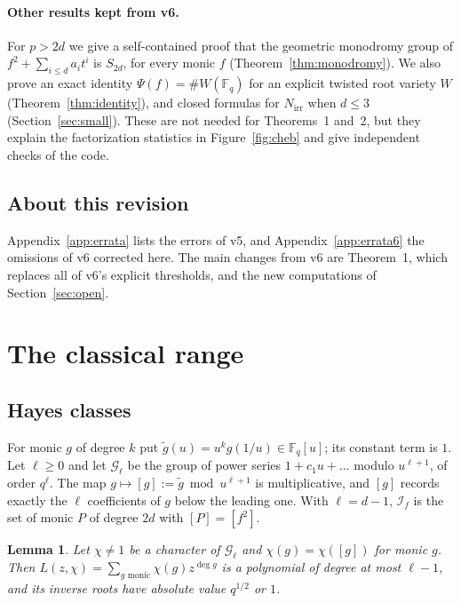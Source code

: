 \documentclass[11pt,a4paper]{article}
\newtheorem{lemma}[theorem]{Lemma}
\theoremstyle{definition}
\theoremstyle{remark}
\newcommand{\Fq}{\mathbb{F}_q}
\newcommand{\Nirr}{N_{\mathrm{irr}}}
\newcommand{\cI}{\mathcal{I}}
\begin{document}
\paragraph{Other results kept from v6.}
For $p>2d$ we give a self-contained proof that the geometric monodromy group of
$f^2+\sum_{i\le d}a_it^i$ is $S_{2d}$, for every monic $f$ (Theorem~\ref{thm:monodromy}).
We also prove an exact identity $\Psi(f)=\#W(\Fq)$ for an explicit twisted root variety $W$
(Theorem~\ref{thm:identity}), and closed formulas for $\Nirr$ when $d\le3$
(Section~\ref{sec:small}). These are not needed for Theorems~1 and~2, but they explain the
factorization statistics in Figure~\ref{fig:cheb} and give independent checks of the code.

\subsection{About this revision}
Appendix~\ref{app:errata} lists the errors of v5, and Appendix~\ref{app:errata6} the
omissions of v6 corrected here. The main changes from v6 are Theorem~1, which replaces all
of v6's explicit thresholds, and the new computations of Section~\ref{sec:open}.

\section{The classical range}\label{sec:classical}

\subsection{Hayes classes}
For monic $g$ of degree $k$ put $\tilde g(u)=u^kg(1/u)\in\Fq[u]$; its constant term is $1$.
Let $\ell\ge0$ and let $\mathcal G_\ell$ be the group of power series $1+c_1u+\dots$ modulo
$u^{\ell+1}$, of order $q^\ell$. The map $g\mapsto[g]:=\tilde g\bmod u^{\ell+1}$ is
multiplicative, and $[g]$ records exactly the $\ell$ coefficients of $g$ below the leading one.
With $\ell=d-1$, $\cI_f$ is the set of monic $P$ of degree $2d$ with $[P]=[f^2]$.

\begin{lemma}\label{lem:hayes}
Let $\chi\ne1$ be a character of $\mathcal G_\ell$ and $\chi(g)=\chi([g])$ for monic $g$.
Then $L(z,\chi)=\sum_{g\text{ monic}}\chi(g)z^{\deg g}$ is a polynomial of degree at most $\ell-1$,
and its inverse roots have absolute value $q^{1/2}$ or $1$.
\end{lemma}
\end{document}
